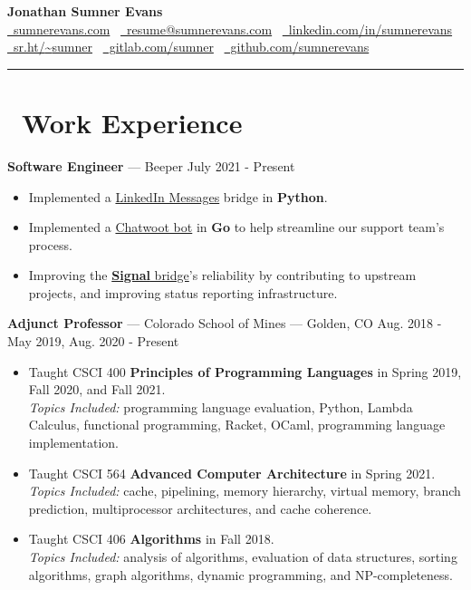 \documentclass[10pt,letterpaper]{article}
\begin{document}
\begin{center}
    {\huge\textbf{Jonathan Sumner Evans}} \\
    \vspace{3pt}
    \href{https://sumnerevans.com}{\faGlobe\ sumnerevans.com}
    \textbar\ \href{mailto:resume@sumnerevans.com}{\faEnvelope\ resume@sumnerevans.com}
    \textbar\ \href{https://www.linkedin.com/in/sumnerevans}{\faLinkedin\ linkedin.com/in/sumnerevans} \\
    \href{https://sr.ht/~sumner}{\faCodeFork\ sr.ht/{\textasciitilde}sumner}
    \textbar\ \href{https://gitlab.com/sumner}{\faGitlab\ gitlab.com/sumner}
    \textbar\ \href{https://github.com/sumnerevans}{\faGithub\ github.com/sumnerevans}
    \rule{\textwidth}{0.5pt}
\end{center}

\section*{\faBriefcase\ Work Experience}
\textbf{Software Engineer} --- Beeper
\hfill July 2021 - Present
\begin{itemize}
    \item Implemented a \href{https://gitlab.com/beeper/linkedin}{LinkedIn
        Messages} bridge in \textbf{Python}.
    \item Implemented a \href{https://gitlab.com/beeper/chatwoot}{Chatwoot bot}
        in \textbf{Go} to help streamline our support team's process. 
    \item Improving the \href{https://github.com/mautrix/signal}{\textbf{Signal}
        bridge}'s reliability by contributing to upstream projects, and
        improving status reporting infrastructure.
\end{itemize}

\textbf{Adjunct Professor} --- Colorado School of Mines --- Golden, CO
\hfill Aug. 2018 - May 2019, Aug. 2020 - Present
\begin{itemize}
    \item Taught CSCI 400 \textbf{Principles of Programming Languages} in Spring
        2019, Fall 2020, and Fall 2021. \\
        \textit{Topics Included:} programming language evaluation, Python,
        Lambda Calculus, functional programming, Racket, OCaml, programming
        language implementation.
    \item Taught CSCI 564 \textbf{Advanced Computer Architecture} in Spring
        2021. \\
        \textit{Topics Included:} cache, pipelining, memory hierarchy, virtual
        memory, branch prediction, multiprocessor architectures, and cache
        coherence.
    \item Taught CSCI 406 \textbf{Algorithms} in Fall 2018. \\
        \textit{Topics Included:} analysis of algorithms, evaluation of data
        structures, sorting algorithms, graph algorithms, dynamic programming,
        and NP-completeness.
\end{itemize}
\end{document}
